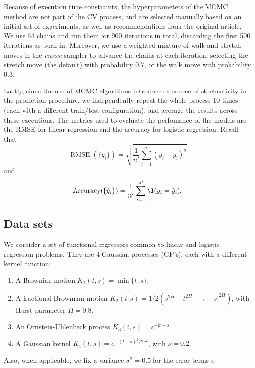 Because of execution time constraints, the hyperparameters of the MCMC method are not part of the CV process, and are selected manually based on an initial set of experiments, as well as recommendations from the original article. We use 64 chains and run them for 900 iterations in total, discarding the first 500 iterations as burn-in. Moreover, we use a weighted mixture of walk and stretch moves in the \textit{emcee} sampler to advance the chains at each iteration, selecting the stretch move (the default) with probability \(0.7\), or the walk move with probability \(0.3\).

Lastly, since the use of MCMC algorithms introduces a source of stochasticity in the prediction procedure, we independently repeat the whole process 10 times (each with a different train/test configuration), and average the results across these executions. The metrics used to evaluate the perfomance of the models are the RMSE for linear regression and the accuracy for logistic regression. Recall that
\[
\operatorname{RMSE}(\{\hat y_i\}) = \sqrt{\frac{1}{n'}\sum_{i=1}^{n'} (y_i - \hat y_i)^2}
\]
and
\[
\operatorname{Accuracy}(\{\hat y_i\}) = \frac{1}{n'} \sum_{i=1}^{n'} \I(y_i = \hat y_i).
\]

\subsection*{Data sets}

We consider a set of functional regressors common to linear and logistic regression problems. They are 4 Gaussian processes (GP's), each with a different kernel function:
\begin{enumerate}
  \item A Brownian motion \(K_1(t,s)=\min\{t,s\}\).
  \item A fractional Browmian motion \(K_2(t,s)=1/2(s^{2H} + t^{2H} - |t-s|^{2H})\), with Hurst parameter \(H=0.8\).
  \item An Ornstein-Uhlenbeck process \(K_3(t,s)=e^{-|t-s|}\).
  \item A Gaussian kernel \(K_4(t,s)=e^{-(t-s)^2/2\nu^2}\), with \(\nu=0.2\).
\end{enumerate}
Also, when applicable, we fix a variance \(\sigma^2=0.5\) for the error terms \(\epsilon\).

